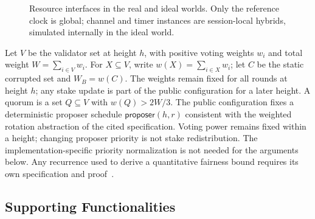 \documentclass[conference,letterpaper,10pt]{IEEEtran}
\begin{document}
\begin{figure}[!t]
\centering
{}
\caption{Resource interfaces in the real and ideal worlds. Only the reference clock is global; channel and timer instances are session-local hybrids, simulated internally in the ideal world.}
\label{Tendermint-framework}
\end{figure}

Let $V$ be the validator set at height $h$, with positive voting weights $w_i$ and total weight $W=\sum_{i\in V}w_i$. For $X\subseteq V$, write $w(X)=\sum_{i\in X}w_i$; let $C$ be the static corrupted set and $W_B=w(C)$. The weights remain fixed for all rounds at height $h$; any stake update is part of the public configuration for a later height. A quorum is a set $Q\subseteq V$ with $w(Q)>2W/3$. The public configuration fixes a deterministic proposer schedule $\mathsf{proposer}(h,r)$ consistent with the weighted rotation abstraction of the cited specification. Voting power remains fixed within a height; changing proposer priority is not stake redistribution. The implementation-specific priority normalization is not needed for the arguments below. Any recurrence used to derive a quantitative fairness bound requires its own specification and proof~\cite{buchman2018latest}.

\subsection{Supporting Functionalities}
\end{document}

